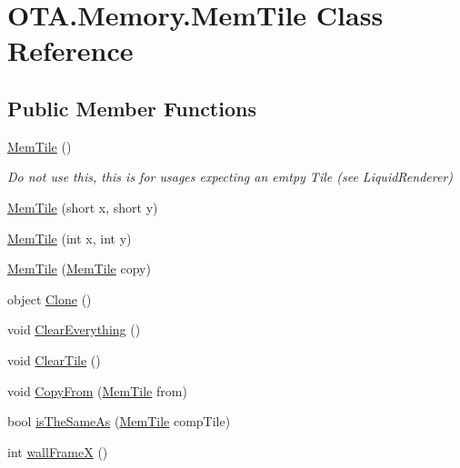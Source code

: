 \hypertarget{class_o_t_a_1_1_memory_1_1_mem_tile}{}\section{O\+T\+A.\+Memory.\+Mem\+Tile Class Reference}
\label{class_o_t_a_1_1_memory_1_1_mem_tile}
\subsection*{Public Member Functions}
\begin{DoxyCompactItemize}
\item 
\hyperlink{class_o_t_a_1_1_memory_1_1_mem_tile_a1713c4b4d7250d556ceea67845077e42}{Mem\+Tile} ()
\begin{DoxyCompactList}\small\item\em Do not use this, this is for usages expecting an emtpy Tile (see Liquid\+Renderer) \end{DoxyCompactList}\item 
\hyperlink{class_o_t_a_1_1_memory_1_1_mem_tile_a2b85524b87ce0105678ac7db74552671}{Mem\+Tile} (short x, short y)
\item 
\hyperlink{class_o_t_a_1_1_memory_1_1_mem_tile_afde4e2724e558d242d8695c407cd9585}{Mem\+Tile} (int x, int y)
\item 
\hyperlink{class_o_t_a_1_1_memory_1_1_mem_tile_aeab66af96481a6da5998034a3c98648a}{Mem\+Tile} (\hyperlink{class_o_t_a_1_1_memory_1_1_mem_tile}{Mem\+Tile} copy)
\item 
object \hyperlink{class_o_t_a_1_1_memory_1_1_mem_tile_a3243631e4be326ec8b687eaf7fb3fef8}{Clone} ()
\item 
void \hyperlink{class_o_t_a_1_1_memory_1_1_mem_tile_ae6d531426fc3f2e2a65bef7d82a1a2ba}{Clear\+Everything} ()
\item 
void \hyperlink{class_o_t_a_1_1_memory_1_1_mem_tile_a510d508eaffff91067b5923afc632cf7}{Clear\+Tile} ()
\item 
void \hyperlink{class_o_t_a_1_1_memory_1_1_mem_tile_acf0a9d2d9972c2cb9e1599de384dec87}{Copy\+From} (\hyperlink{class_o_t_a_1_1_memory_1_1_mem_tile}{Mem\+Tile} from)
\item 
bool \hyperlink{class_o_t_a_1_1_memory_1_1_mem_tile_ac586bd1fe34eb143055b043081c4f434}{is\+The\+Same\+As} (\hyperlink{class_o_t_a_1_1_memory_1_1_mem_tile}{Mem\+Tile} comp\+Tile)
\item 
int \hyperlink{class_o_t_a_1_1_memory_1_1_mem_tile_a03f092eaa74d2e8c0fac17a2a83d5e7b}{wall\+Frame\+X} ()

\end{DoxyCompactItemize}
